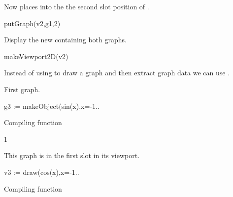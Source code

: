 \begin{xtc}
\begin{xtccomment}
Now 
places  into the the second slot position of .
\end{xtccomment}
\begin{spadsrc}
putGraph(v2,g1,2) 
\end{spadsrc}
\end{xtc}
\begin{psXtc}
\begin{xtccomment}
Display the new  containing both graphs.
\end{xtccomment}
\begin{spadsrc}
makeViewport2D(v2) 
\end{spadsrc}
%
\end{psXtc}
Instead of using  to draw a graph and then extract
graph data we can use .
\begin{xtc}
\begin{xtccomment}
First graph.
\end{xtccomment}
\begin{spadsrc}
g3 := makeObject(sin(x),x=-1..%
\end{spadsrc}
\begin{MessageOutput}
   Compiling function %
\end{MessageOutput}
\begin{TeXOutput}
\begin{fricasmath}{5}
1%
\end{fricasmath}
\end{TeXOutput}
\end{xtc}
\begin{xtc}
\begin{xtccomment}
This graph is in the first slot in its viewport.
\end{xtccomment}
\begin{spadsrc}
v3 := draw(cos(x),x=-1..%
\end{spadsrc}
\begin{MessageOutput}
   Compiling function %
\end{MessageOutput}
\begin{TeXOutput}
\begin{fricasmath}{6}
%
\end{fricasmath}
\end{TeXOutput}
\end{xtc}

